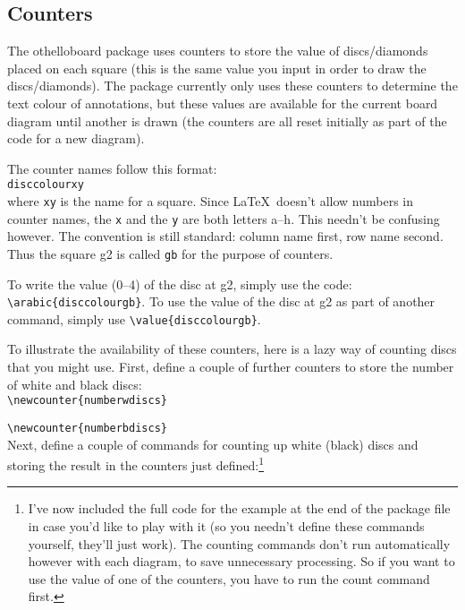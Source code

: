 \documentclass[a4paper,12pt]{article}
\begin{document}
\subsection{Counters}
The \textsf{othelloboard} package uses counters to store the value of discs/diamonds placed on each square (this is the same value you input in order to draw the discs/diamonds). The package currently only uses these counters to determine the text colour of annotations, but these values are available for the current board diagram until another is drawn (the counters are all reset initially as part of the code for a new diagram).

The counter names follow this format:\\

\verb=disccolourxy=\\

where \verb=xy= is the name for a square. Since \LaTeX\ doesn't allow numbers in counter names, the \verb=x= and the \verb=y= are both letters a--h. This needn't be confusing however. The convention is still standard: column name first, row name second. Thus the square g2 is called \verb=gb= for the purpose of counters.

\noindent To write the value (0--4) of the disc at g2, simply use the code: \verb=\arabic{disccolourgb}=. To use the value of the disc at g2 as part of another command, simply use \verb=\value{disccolourgb}=.

\noindent To illustrate the availability of these counters, here is a lazy way of counting discs that you might use. First, define a couple of further counters to store the number of white and black discs:\\

\verb=\newcounter{numberwdiscs}=

\verb=\newcounter{numberbdiscs}=\\

Next, define a couple of commands for counting up white (black) discs and storing the result in the counters just defined:\footnote{I've now included the full code for the example at the end of the package file in case you'd like to play with it (so you needn't define these commands yourself, they'll just work). The counting commands don't run automatically however with each diagram, to save unnecessary processing. So if you want to use the value of one of the counters, you have to run the count command first.}

\begin{verbatimtab}
\newcommand{\countwhitediscs}{%
\ifthenelse{\equal{\value{disccolouraa}}{1}}{\addtocounter{numberwdiscs}{1}}{}
\ifthenelse{\equal{\value{disccolourba}}{1}}{\addtocounter{numberwdiscs}{1}}{}
... }
\end{verbatimtab}
\end{document}
